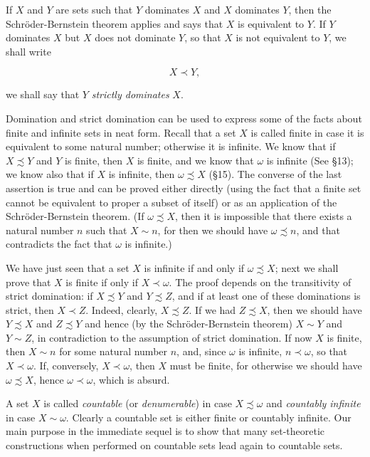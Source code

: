 
If $X$ and $Y$ are sets such that $Y$ dominates $X$ and $X$ dominates $Y$, then the Schröder-Bernstein theorem applies and says that $X$ is equivalent to $Y$. If $Y$ dominates $X$ but $X$ does not dominate $Y$, so that $X$ is not equivalent to $Y$, we shall write 

\begin{equation*}
X \prec Y, 
\end{equation*}

we shall say that $Y$ \textit{strictly dominates} $X$.

Domination and strict domination can be used to express some of the facts about finite and infinite sets in neat form. Recall that a set $X$ is called finite in case it is equivalent to some natural number; otherwise it is infinite. We know that if $X \precsim Y$ and $Y$ is finite, then $X$ is finite, and we know that $\omega$ is infinite (See \S 13); we know also that if $X$ is infinite, then $\omega \precsim X$ (\S 15). The converse of the last assertion is true and can be proved either directly (using the fact that a finite set cannot be equivalent to proper a subset of itself) or as an application of the Schröder-Bernstein theorem. (If $\omega \precsim X$, then it is impossible that there exists a natural number $n$ such that $X \sim n$, for then we should have $\omega \precsim n$, and that contradicts the fact that $\omega$ is infinite.) 

We have just seen that a set $X$ is infinite if and only if $\omega \precsim X$; next we shall prove that $X$ is finite if only if $X \prec \omega$. The proof depends on the transitivity of strict domination: if $X \precsim Y$ and $Y \precsim Z$, and if at least one of these dominations is strict, then $X \prec Z$. Indeed, clearly, $X \precsim Z$. If we had $Z \precsim X$, then we should have $Y \precsim X$ and $Z \precsim Y$ and hence (by the Schröder-Bernstein theorem) $X \sim Y$ and $Y \sim Z$, in contradiction to the assumption of strict domination. If now $X$ is finite, then $X \sim n$ for some natural number $n$, and, since $\omega$ is infinite, $n \prec \omega$, so that $X \prec \omega$. If, conversely, $X \prec \omega$, then $X$ must be finite, for otherwise we should have $\omega \precsim X$, hence $\omega \prec \omega$, which is absurd. 

A set $X$ is called \textit{countable} (or \textit{denumerable}) in case $X \precsim \omega$ and \textit{countably infinite} in case $X \sim \omega$. Clearly a countable set is either finite or countably infinite. Our main purpose in the immediate sequel is to show that many set-theoretic constructions when performed on countable sets lead again to countable sets. 

